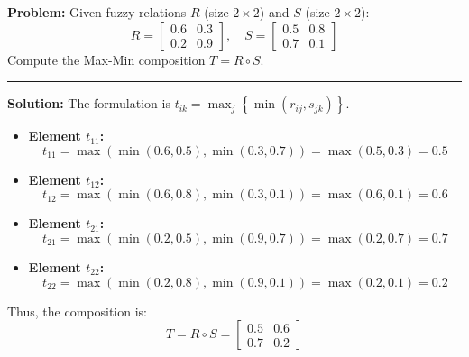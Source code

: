 \documentclass[12pt,a4paper]{article}
\begin{document}
\begin{tcolorbox}[examplebox, title={Max-Min Composition of Fuzzy Relations}]
\textbf{Problem:} Given fuzzy relations $R$ (size $2 \times 2$) and $S$ (size $2 \times 2$):
\begin{equation*}
  R = \begin{bmatrix} 0.6 & 0.3 \\ 0.2 & 0.9 \end{bmatrix}, \quad S = \begin{bmatrix} 0.5 & 0.8 \\ 0.7 & 0.1 \end{bmatrix}
\end{equation*}
Compute the Max-Min composition $T = R \circ S$.
\par\vspace{4pt}\noindent\rule{\linewidth}{0.5pt}\par
\textbf{Solution:}
The formulation is $t_{ik} = \max_j \left\{ \min\left(r_{ij}, s_{jk}\right) \right\}$.
\begin{itemize}[leftmargin=*, itemsep=3.5pt]
  \item \textbf{Element $t_{11}$:}
    \begin{equation*}
      t_{11} = \max\left( \min(0.6, 0.5), \min(0.3, 0.7) \right) = \max(0.5, 0.3) = 0.5
    \end{equation*}
  \item \textbf{Element $t_{12}$:}
    \begin{equation*}
      t_{12} = \max\left( \min(0.6, 0.8), \min(0.3, 0.1) \right) = \max(0.6, 0.1) = 0.6
    \end{equation*}
  \item \textbf{Element $t_{21}$:}
    \begin{equation*}
      t_{21} = \max\left( \min(0.2, 0.5), \min(0.9, 0.7) \right) = \max(0.2, 0.7) = 0.7
    \end{equation*}
  \item \textbf{Element $t_{22}$:}
    \begin{equation*}
      t_{22} = \max\left( \min(0.2, 0.8), \min(0.9, 0.1) \right) = \max(0.2, 0.1) = 0.2
    \end{equation*}
\end{itemize}
Thus, the composition is:
\begin{equation*}
  T = R \circ S = \begin{bmatrix} 0.5 & 0.6 \\ 0.7 & 0.2 \end{bmatrix}
\end{equation*}
\end{tcolorbox}
\end{document}
